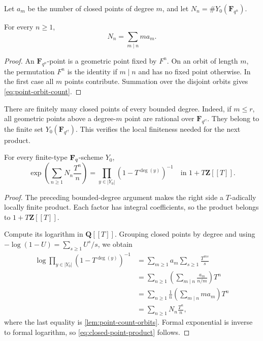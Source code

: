 Let \(a_m\) be the number of closed points of degree \(m\), and let
\(N_n=\#Y_0(\mathbf F_{q^n})\).

\begin{lemma}
\label{lem:point-count-orbits}
For every \(n\geq1\),
\[
  N_n=\sum_{m\mid n}ma_m.
  \tag{2.2}\label{eq:point-orbit-count}
\]
\end{lemma}

\begin{proof}
An \(\mathbf F_{q^n}\)-point is a geometric point fixed by \(F^n\).  On
an orbit of length \(m\), the permutation \(F^n\) is the identity if
\(m\mid n\) and has no fixed point otherwise.  In the first case all
\(m\) points contribute.  Summation over the disjoint orbits gives
\eqref{eq:point-orbit-count}.
\end{proof}

There are finitely many closed points of every bounded degree.  Indeed,
if \(m\leq r\), all geometric points above a degree-\(m\) point are
rational over \(\mathbf F_{q^{r!}}\).  They belong to the finite set
\(Y_0(\mathbf F_{q^{r!}})\).  This verifies the local finiteness needed
for the next product.

\begin{proposition}
\label{prop:euler-product}
For every finite-type \(\mathbf F_q\)-scheme \(Y_0\),
\[
 \exp\left(\sum_{n\geq1}N_n\frac{T^n}{n}\right)
 =\prod_{y\in|Y_0|}(1-T^{\deg(y)})^{-1}
 \quad\text{in }1+T\mathbf Z[[T]].
 \tag{2.3}\label{eq:closed-point-product}
\]
\end{proposition}

\begin{proof}
The preceding bounded-degree argument makes the right side a
\(T\)-adically locally finite product.  Each factor has integral
coefficients, so the product belongs to \(1+T\mathbf Z[[T]]\).

Compute its logarithm in \(\mathbf Q[[T]]\).  Grouping closed points by
degree and using
\(-\log(1-U)=\sum_{s\geq1}U^s/s\), we obtain
\[
\begin{aligned}
 \log\prod_{y\in|Y_0|}(1-T^{\deg(y)})^{-1}
 &=\sum_{m\geq1}a_m\sum_{s\geq1}\frac{T^{ms}}s\\
 &=\sum_{n\geq1}\left(\sum_{m\mid n}\frac{a_m}{n/m}\right)T^n\\
 &=\sum_{n\geq1}\frac1n
        \left(\sum_{m\mid n}ma_m\right)T^n\\
 &=\sum_{n\geq1}N_n\frac{T^n}{n},
\end{aligned}
\]
where the last equality is \cref{lem:point-count-orbits}.  Formal
exponential is inverse to formal logarithm, so
\eqref{eq:closed-point-product} follows.
\end{proof}

